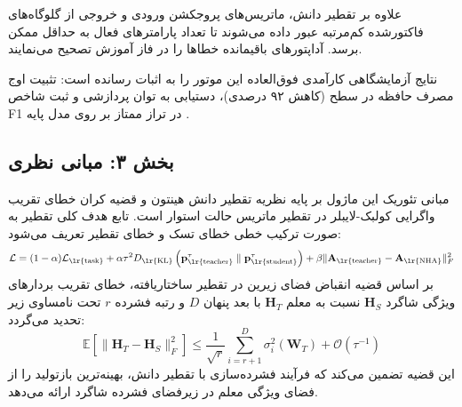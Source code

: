 علاوه بر تقطیر دانش، ماتریس‌های پروجکشن ورودی و خروجی از گلوگاه‌های فاکتورشده کم‌مرتبه عبور داده می‌شوند تا تعداد پارامترهای فعال به حداقل ممکن برسد. آداپتورهای باقیمانده خطاها را در فاز آموزش تصحیح می‌نمایند.

نتایج آزمایشگاهی کارآمدی فوق‌العاده این موتور را به اثبات رسانده است: تثبیت اوج مصرف حافظه در سطح  (کاهش ۹۲ درصدی)، دستیابی به توان پردازشی  و ثبت شاخص F1 در تراز ممتاز  بر روی مدل پایه .

\subsection*{بخش ۳: مبانی نظری }
مبانی تئوریک این ماژول بر پایه نظریه تقطیر دانش هینتون و قضیه کران خطای تقریب واگرایی کولبک-لایبلر در تقطیر ماتریس حالت استوار است. تابع هدف کلی تقطیر به صورت ترکیب خطی خطای تسک و خطای تقطیر تعریف می‌شود:
\begin{equation}
\mathcal{L} = (1 - \alpha)\mathcal{L}_{\text{\lr{task}}} + \alpha \tau^2 D_{\text{\lr{KL}}}\left(\mathbf{p}_{\text{\lr{teacher}}}^\tau \parallel \mathbf{p}_{\text{\lr{student}}}^\tau\right) + \beta \|\mathbf{A}_{\text{\lr{teacher}}} - \mathbf{A}_{\text{\lr{NHA}}}\|_F^2
\end{equation}
بر اساس قضیه انقباض فضای زیرین در تقطیر ساختاریافته، خطای تقریب بردارهای ویژگی شاگرد $\mathbf{H}_S$ نسبت به معلم $\mathbf{H}_T$ با بعد پنهان $D$ و رتبه فشرده $r$ تحت نامساوی زیر تحدید می‌گردد:
\begin{equation}
\mathbb{E}[\|\mathbf{H}_T - \mathbf{H}_S\|_F^2] \le \frac{1}{\sqrt{r}} \sum_{i=r+1}^D \sigma_i^2(\mathbf{W}_T) + \mathcal{O}(\tau^{-1})
\end{equation}
این قضیه تضمین می‌کند که فرآیند فشرده‌سازی با تقطیر دانش، بهینه‌ترین بازتولید را از فضای ویژگی معلم در زیرفضای فشرده شاگرد ارائه می‌دهد.

